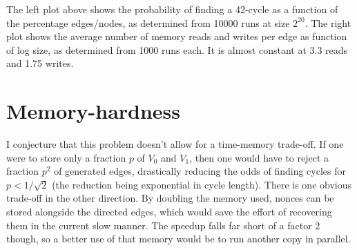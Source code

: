 \documentclass[11pt, oneside]{article}
\begin{document}
\begin{center}
\hspace{1cm}
\end{center}

The left plot above shows the probability of finding a 42-cycle as a function of the percentage edges/nodes,
as determined from 10000 runs at size $2^{20}$. The right plot shows the average
number of memory reads and writes per edge as function of log size, as determined from 1000 runs each.
It is almost constant at 3.3 reads and 1.75 writes.

\section{Memory-hardness}
I conjecture that this problem doesn't allow for a time-memory trade-off. If
one were to store only a fraction $p$ of $V_0$ and $V_1$, then one would have
to reject a fraction $p^2$ of generated edges, drastically reducing the odds of
finding cycles for $p<1/\sqrt{2}$ (the reduction being exponential in cycle length).
There is one obvious trade-off in the other direction. By doubling the memory
used, nonces can be stored alongside the directed edges, which would save the
effort of recovering them in the current slow manner. The speedup falls far
short of a factor 2 though, so a better use of that memory would be to run
another copy in parallel.
\end{document}

